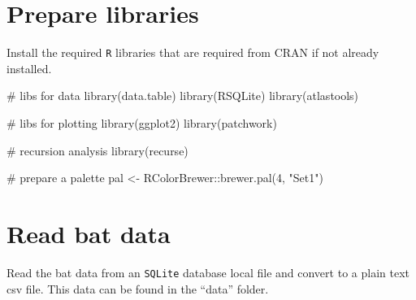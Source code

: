 \documentclass[]{scrreprt}
\newenvironment{Shaded}{}{}
\newcommand{\CharTok}[1]{\textcolor[rgb]{0.00,0.50,0.50}{#1}}
\newcommand{\CommentTok}[1]{\textcolor[rgb]{0.00,0.50,0.00}{#1}}
\newcommand{\DataTypeTok}[1]{#1}
\newcommand{\DecValTok}[1]{#1}
\newcommand{\KeywordTok}[1]{\textcolor[rgb]{0.00,0.00,1.00}{#1}}
\newcommand{\NormalTok}[1]{#1}
\newcommand{\OperatorTok}[1]{#1}
\newcommand{\StringTok}[1]{\textcolor[rgb]{0.00,0.50,0.50}{#1}}
\begin{document}
\hypertarget{prepare-libraries-1}{%
\section{Prepare libraries}\label{prepare-libraries-1}}

Install the required \texttt{R} libraries that are required from CRAN if not already installed.

\begin{Shaded}
\begin{Highlighting}[]
\CommentTok{# libs for data}
\KeywordTok{library}\NormalTok{(data.table)}
\KeywordTok{library}\NormalTok{(RSQLite)}
\KeywordTok{library}\NormalTok{(atlastools)}

\CommentTok{# libs for plotting}
\KeywordTok{library}\NormalTok{(ggplot2)}
\KeywordTok{library}\NormalTok{(patchwork)}

\CommentTok{# recursion analysis}
\KeywordTok{library}\NormalTok{(recurse)}

\CommentTok{# prepare a palette}
\NormalTok{pal <-}\StringTok{ }\NormalTok{RColorBrewer}\OperatorTok{::}\KeywordTok{brewer.pal}\NormalTok{(}\DecValTok{4}\NormalTok{, }\StringTok{"Set1"}\NormalTok{)}
\end{Highlighting}
\end{Shaded}

\hypertarget{read-bat-data}{%
\section{Read bat data}\label{read-bat-data}}

Read the bat data from an \texttt{SQLite} database local file and convert to a plain text csv file.
This data can be found in the ``data'' folder.

\begin{Shaded}
\end{Shaded}
\end{document}
